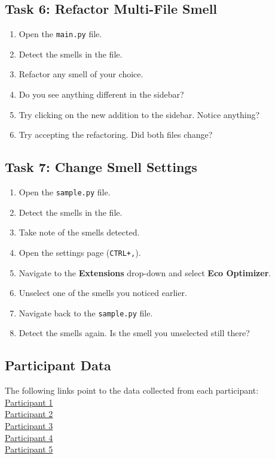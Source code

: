 \documentclass[12pt, titlepage]{article}
\begin{document}
\subsection*{Task 6: Refactor Multi-File Smell}
\begin{enumerate}
    \item Open the \texttt{main.py} file.
    \item Detect the smells in the file.
    \item Refactor any smell of your choice.
    \item Do you see anything different in the sidebar?
    \item Try clicking on the new addition to the sidebar. Notice anything?
    \item Try accepting the refactoring. Did both files change?
\end{enumerate}

\subsection*{Task 7: Change Smell Settings}
\begin{enumerate}
    \item Open the \texttt{sample.py} file.
    \item Detect the smells in the file.
    \item Take note of the smells detected.
    \item Open the settings page (\texttt{CTRL+,}).
    \item Navigate to the \textbf{Extensions} drop-down and select \textbf{Eco Optimizer}.
    \item Unselect one of the smells you noticed earlier.
    \item Navigate back to the \texttt{sample.py} file.
    \item Detect the smells again. Is the smell you unselected still there?
\end{enumerate}

\subsection*{Participant Data}
The following links point to the data collected from each participant:\\

{\noindent
\href{run:./../Extras/UsabilityTesting/test_data/participant1-data.csv}{Participant 1} \\[2mm]
\href{run:./../Extras/UsabilityTesting/test_data/participant2-data.csv}{Participant 2} \\[2mm]
\href{run:./../Extras/UsabilityTesting/test_data/participant3-data.csv}{Participant 3} \\[2mm]
\href{run:./../Extras/UsabilityTesting/test_data/participant4-data.csv}{Participant 4} \\[2mm]
\href{run:./../Extras/UsabilityTesting/test_data/participant5-data.csv}{Participant 5}
}
\end{document}
